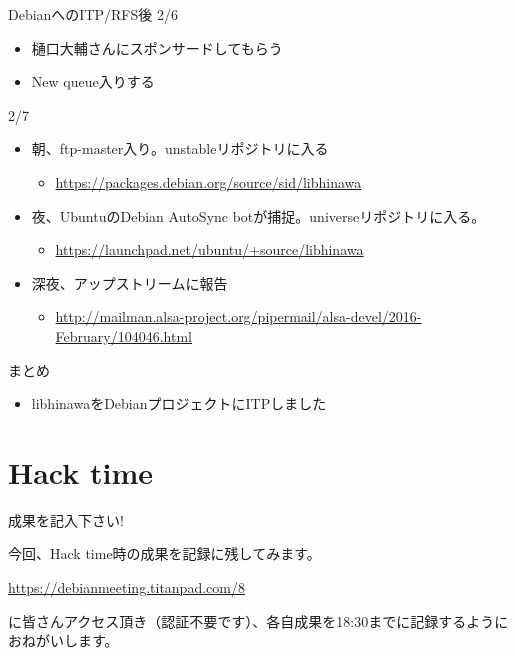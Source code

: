 \begin{frame}{DebianへのITP/RFS後}
  2/6
  \begin{itemize}
  \item 樋口大輔さんにスポンサードしてもらう
  \item New queue入りする
  \end{itemize}
  2/7
  \begin{itemize}
  \item 朝、ftp-master入り。unstableリポジトリに入る
  \begin{itemize}
  \item \url{https://packages.debian.org/source/sid/libhinawa}
  \end{itemize}
  \item 夜、UbuntuのDebian AutoSync botが捕捉。universeリポジトリに入る。
  \begin{itemize}
  \item \url{https://launchpad.net/ubuntu/+source/libhinawa}
  \end{itemize}
  \item 深夜、アップストリームに報告
  \begin{itemize}
  \item
\url{http://mailman.alsa-project.org/pipermail/alsa-devel/2016-February/104046.html}
  \end{itemize}
  \end{itemize}
\end{frame}

\begin{frame}{まとめ}
\begin{itemize}
\item libhinawaをDebianプロジェクトにITPしました
\end{itemize}
\end{frame}

\section{Hack time}

\begin{frame}{成果を記入下さい!}

  今回、Hack time時の成果を記録に残してみます。

\url{https://debianmeeting.titanpad.com/8}

に皆さんアクセス頂き（認証不要です）、各自成果を18:30までに記録するようにおねがいします。

\end{frame}
  
